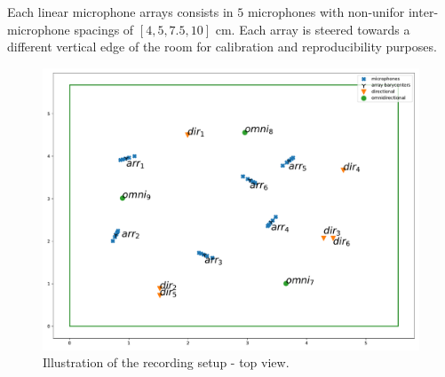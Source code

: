 Each linear microphone arrays consists in $5$ microphones with non-unifor inter-microphone spacings of $[4, 5, 7.5, 10]$ cm. Each array is steered towards a different vertical edge of the room for calibration and reproducibility purposes.

\begin{figure}
    \centering
    \includegraphics[width=\linewidth]{figures/dechorate/positioning2D_xy.pdf}
    \caption{Illustration of the recording setup - top view.}
    \label{fig:2D}
\end{figure}

